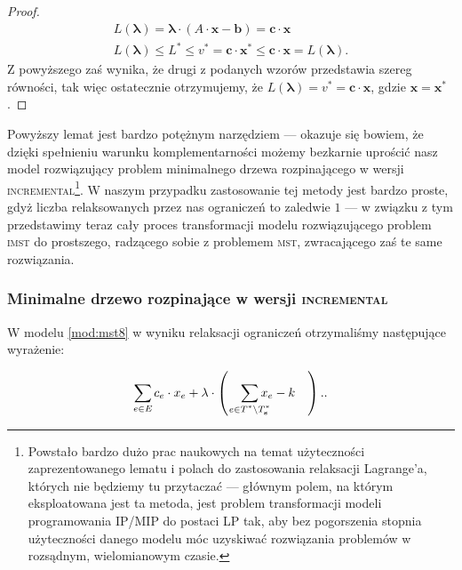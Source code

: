 \begin{proof}
	\begin{gather}
		L \left( \boldsymbol{\lambda} \right) = \boldsymbol{\lambda} \cdot \left( A \cdot \textbf{x} - \textbf{b} \right) = \textbf{c} \cdot \textbf{x}\\
		L \left( \boldsymbol{\lambda} \right) \leqslant L^{\ast} \leqslant v^{\ast} = \textbf{c} \cdot \textbf{x}^{\ast} \leqslant \textbf{c} \cdot \textbf{x} = L \left( \boldsymbol{\lambda} \right)\text{.}
	\end{gather}
	Z powyższego zaś wynika, że drugi z podanych wzorów przedstawia szereg równości, tak więc ostatecznie otrzymujemy, że $L \left( \boldsymbol{\lambda} \right) = v^{\ast} = \textbf{c} \cdot \textbf{x}$, gdzie $\textbf{x} = \textbf{x}^{\ast}$.
\end{proof}

Powyższy lemat jest bardzo potężnym narzędziem --- okazuje się bowiem, że dzięki spełnieniu warunku komplementarności możemy bezkarnie uprościć nasz model rozwiązujący problem minimalnego drzewa rozpinającego w wersji \textsc{incremental}\footnote{Powstało bardzo dużo prac naukowych na temat użyteczności zaprezentowanego lematu i polach do zastosowania relaksacji Lagrange'a, których nie będziemy tu przytaczać --- głównym polem, na którym eksploatowana jest ta metoda, jest problem transformacji modeli programowania \textsc{IP}/\textsc{MIP} do postaci \textsc{LP} tak, aby bez pogorszenia stopnia użyteczności danego modelu móc uzyskiwać rozwiązania problemów w rozsądnym, wielomianowym czasie.}. W naszym przypadku zastosowanie tej metody jest bardzo proste, gdyż liczba relaksowanych przez nas ograniczeń to zaledwie $1$ --- w związku z tym przedstawimy teraz cały proces transformacji modelu rozwiązującego problem \textsc{imst} do prostszego, radzącego sobie z problemem \textsc{mst}, zwracającego zaś te same rozwiązania.

\subsubsection{Minimalne drzewo rozpinające w wersji \textsc{incremental}}

W modelu \ref{mod:mst8} w wyniku relaksacji ograniczeń otrzymaliśmy następujące wyrażenie:

\begin{equation}\label{eq:imstrelax}
	\sum_{\mathclap{e \in E}} c_{e} \cdot x_{e} + \lambda \cdot \left( \quad \sum_{\mathclap{e \in T^{\ast} \setminus T^{\ast}_{\textbf{s}}}} x_{e} - k \quad \right)\text{.}.
\end{equation}

